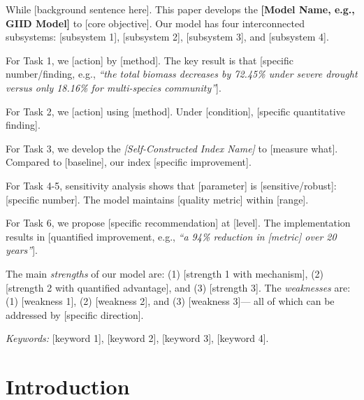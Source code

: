 \documentclass[12pt]{article}
\begin{document}
\begin{center}
    While [background sentence here]. This paper develops the \textbf{[Model Name, e.g., GIID Model]}
    to [core objective]. Our model has four interconnected subsystems: [subsystem 1],
    [subsystem 2], [subsystem 3], and [subsystem 4].

    \vspace{0.2cm}

    For Task 1, we [action] by [method]. The key result is that [specific number/finding, e.g.,
    \textit{``the total biomass decreases by 72.45\% under severe drought versus only 18.16\% for
    multi-species community''}].

    For Task 2, we [action] using [method]. Under [condition], [specific quantitative finding].

    For Task 3, we develop the \textit{[Self-Constructed Index Name]} to [measure what].
    Compared to [baseline], our index [specific improvement].

    For Task 4-5, sensitivity analysis shows that [parameter] is [sensitive/robust]:
    [specific number]. The model maintains [quality metric] within [range].

    For Task 6, we propose [specific recommendation] at [level]. The implementation
    results in [quantified improvement, e.g., \textit{``a 94\% reduction in [metric] over 20 years''}].

    \vspace{0.2cm}

    The main \textit{strengths} of our model are: (1) [strength 1 with mechanism],
    (2) [strength 2 with quantified advantage], and (3) [strength 3].
    The \textit{weaknesses} are: (1) [weakness 1], (2) [weakness 2], and (3) [weakness 3]---
    all of which can be addressed by [specific direction].

    \vspace{0.3cm}

    \textit{Keywords:} [keyword 1], [keyword 2], [keyword 3], [keyword 4].
\end{center}

\vfill
\pagebreak

\tableofcontents
\clearpage

\section{Introduction}
\end{document}

